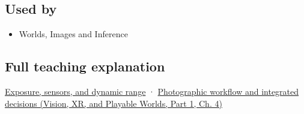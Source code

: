 \subsection{Used by}\label{appendix-92d45cdf2afc-used-by}

\hypertarget{appendix-92d45cdf2afc-used-by}{}

\begin{itemize}
\tightlist
\item
  {Worlds, Images and Inference}
\end{itemize}

\subsection{Full teaching explanation}\label{appendix-92d45cdf2afc-full-teaching-explanation}

\hypertarget{appendix-92d45cdf2afc-full-teaching-explanation}{}

\hyperref[03-visual-computing-i-ch003-exposure-sensors-and-dynamic-range]{Exposure, sensors, and dynamic range} · \href{../07-Vision-XR-and-Playable-Worlds-P01/main.pdf\#04-visual-computing-ii-ch034-photographic-workflow-and-integrated-decisions}{Photographic workflow and integrated decisions (Vision, XR, and Playable Worlds, Part 1, Ch. 4)}
